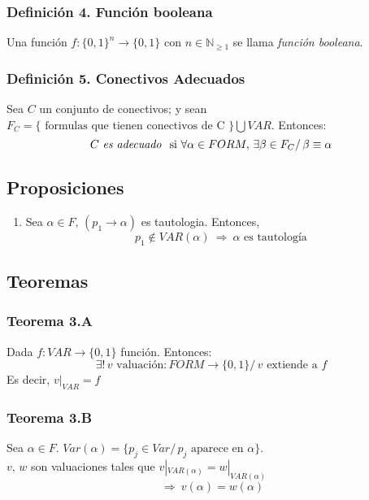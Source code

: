 \documentclass{article}
\newcommand{\comma}{,\,}                                %
\newcommand{\tq}{/\,}                                   %
\newcommand{\naturales}{\mathbb{N}}                     %
\newcommand{\Rightarrows}{\: \Rightarrow \:}            %
\newcommand{\existsuniq}{\exists !\,}                   %
\begin{document}
\subsubsection*{Definición 4. Función booleana}
Una función $f: \{0,1\}^n \rightarrow \{0,1\}$ con $n \in \naturales_{\geq 1}$ se llama \emph{función booleana}.

\subsubsection*{Definición 5. Conectivos Adecuados}
Sea $C$ un conjunto de conectivos; y sean $F_C = \{ \text{ formulas que tienen conectivos de C } \} \bigcup VAR$. Entonces:
\begin{equation*}
    C \text{ \emph{es adecuado } si } \forall \alpha \in FORM \comma \exists \beta \in F_C \tq \beta \equiv \alpha
\end{equation*}


\subsection{Proposiciones}
\begin{enumerate}
    \item Sea $\alpha \in F \comma (p_1 \rightarrow \alpha)$ es tautologia. Entonces,
    \begin{equation*}
        p_1 \notin VAR(\alpha) \Rightarrows \alpha \text{ es tautología}
    \end{equation*}
\end{enumerate}


\subsection{Teoremas}
\subsubsection{Teorema 3.A}
Dada $f: VAR \rightarrow \{0,1\}$ función. Entonces:
\begin{equation*}
    \existsuniq v \text{ valuación}: FORM \rightarrow \{0,1\} \tq v \text{ extiende a $f$}
\end{equation*}
Es decir, $v|_{VAR} = f$

\subsubsection{Teorema 3.B}
Sea $\alpha \in F$. $Var(\alpha) = \{ p_j \in Var \tq p_j \text{ aparece en } \alpha \}$.
\\$v \comma w$ son valuaciones tales que $v|_{VAR(\alpha)} = w|_{VAR(\alpha)}$
\begin{equation*}
    \Rightarrows v(\alpha) = w(\alpha)
\end{equation*}
\end{document}
